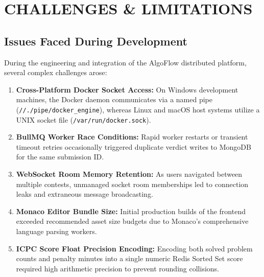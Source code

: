 \documentclass[12pt,a4paper]{report}
\begin{document}
\clearpage

\chapter{CHALLENGES \& LIMITATIONS}

\section{Issues Faced During Development}
During the engineering and integration of the AlgoFlow distributed platform, several complex challenges arose:
\begin{enumerate}[leftmargin=*, label=\bfseries\arabic*.]
  \item \textbf{Cross-Platform Docker Socket Access:} On Windows development machines, the Docker daemon communicates via a named pipe (\texttt{//./pipe/docker\_engine}), whereas Linux and macOS host systems utilize a UNIX socket file (\texttt{/var/run/docker.sock}).
  \item \textbf{BullMQ Worker Race Conditions:} Rapid worker restarts or transient timeout retries occasionally triggered duplicate verdict writes to MongoDB for the same submission ID.
  \item \textbf{WebSocket Room Memory Retention:} As users navigated between multiple contests, unmanaged socket room memberships led to connection leaks and extraneous message broadcasting.
  \item \textbf{Monaco Editor Bundle Size:} Initial production builds of the frontend exceeded recommended asset size budgets due to Monaco's comprehensive language parsing workers.
  \item \textbf{ICPC Score Float Precision Encoding:} Encoding both solved problem counts and penalty minutes into a single numeric Redis Sorted Set score required high arithmetic precision to prevent rounding collisions.
\end{enumerate}
\end{document}

